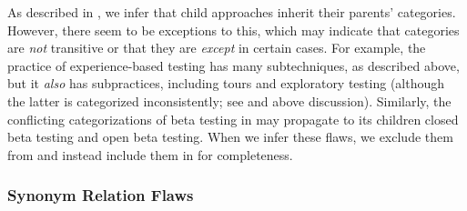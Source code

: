 \ifnotpaper
    As described in , we infer that child approaches inherit their
    parents' categories. However, there seem to be exceptions to this, which
    may indicate that categories are \emph{not} transitive or that they are
    \emph{except} in certain cases. For example, the practice of experience-based
    testing has many subtechniques, as described above, but it \emph{also} has
    subpractices, including tours \citep[p.~34]{IEEE2022} and exploratory testing
    (although the latter is categorized inconsistently; see 
    and above discussion). Similarly, the conflicting categorizations of beta
    testing in  may propagate to its children closed beta
    testing and open beta testing. When we infer these flaws, we exclude them
    from  and instead include them in
     for completeness.
\fi

\subsubsection{Synonym Relation Flaws}\label{syns}

